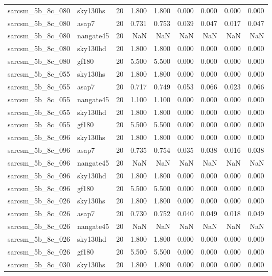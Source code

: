 \begin{tabular}{llrrrrrrr}
sarcsm\_5b\_8c\_080 & sky130hs & 20 & 1.800 & 1.800 & 0.000 & 0.000 & 0.000 & 0.000 \\
sarcsm\_5b\_8c\_080 & asap7 & 20 & 0.731 & 0.753 & 0.039 & 0.047 & 0.017 & 0.047 \\
sarcsm\_5b\_8c\_080 & nangate45 & 20 & NaN & NaN & NaN & NaN & NaN & NaN \\
sarcsm\_5b\_8c\_080 & sky130hd & 20 & 1.800 & 1.800 & 0.000 & 0.000 & 0.000 & 0.000 \\
sarcsm\_5b\_8c\_080 & gf180 & 20 & 5.500 & 5.500 & 0.000 & 0.000 & 0.000 & 0.000 \\
sarcsm\_5b\_8c\_055 & sky130hs & 20 & 1.800 & 1.800 & 0.000 & 0.000 & 0.000 & 0.000 \\
sarcsm\_5b\_8c\_055 & asap7 & 20 & 0.717 & 0.749 & 0.053 & 0.066 & 0.023 & 0.066 \\
sarcsm\_5b\_8c\_055 & nangate45 & 20 & 1.100 & 1.100 & 0.000 & 0.000 & 0.000 & 0.000 \\
sarcsm\_5b\_8c\_055 & sky130hd & 20 & 1.800 & 1.800 & 0.000 & 0.000 & 0.000 & 0.000 \\
sarcsm\_5b\_8c\_055 & gf180 & 20 & 5.500 & 5.500 & 0.000 & 0.000 & 0.000 & 0.000 \\
sarcsm\_5b\_8c\_096 & sky130hs & 20 & 1.800 & 1.800 & 0.000 & 0.000 & 0.000 & 0.000 \\
sarcsm\_5b\_8c\_096 & asap7 & 20 & 0.735 & 0.754 & 0.035 & 0.038 & 0.016 & 0.038 \\
sarcsm\_5b\_8c\_096 & nangate45 & 20 & NaN & NaN & NaN & NaN & NaN & NaN \\
sarcsm\_5b\_8c\_096 & sky130hd & 20 & 1.800 & 1.800 & 0.000 & 0.000 & 0.000 & 0.000 \\
sarcsm\_5b\_8c\_096 & gf180 & 20 & 5.500 & 5.500 & 0.000 & 0.000 & 0.000 & 0.000 \\
sarcsm\_5b\_8c\_026 & sky130hs & 20 & 1.800 & 1.800 & 0.000 & 0.000 & 0.000 & 0.000 \\
sarcsm\_5b\_8c\_026 & asap7 & 20 & 0.730 & 0.752 & 0.040 & 0.049 & 0.018 & 0.049 \\
sarcsm\_5b\_8c\_026 & nangate45 & 20 & NaN & NaN & NaN & NaN & NaN & NaN \\
sarcsm\_5b\_8c\_026 & sky130hd & 20 & 1.800 & 1.800 & 0.000 & 0.000 & 0.000 & 0.000 \\
sarcsm\_5b\_8c\_026 & gf180 & 20 & 5.500 & 5.500 & 0.000 & 0.000 & 0.000 & 0.000 \\
sarcsm\_5b\_8c\_030 & sky130hs & 20 & 1.800 & 1.800 & 0.000 & 0.000 & 0.000 & 0.000 \\

\end{tabular}
